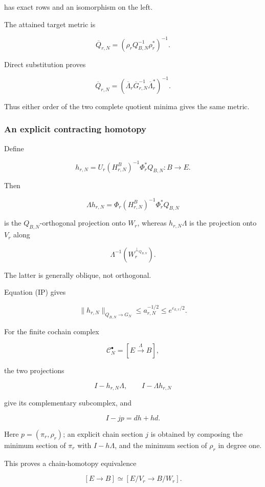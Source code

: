 \documentclass[11pt]{article}
\begin{document}
has exact rows and an isomorphism on the left.

The attained target metric is

\[
\overline Q_{r,N}
=
(\rho_rQ_{B,N}^{-1}\rho_r^*)^{-1}.
\]

Direct substitution proves

\[
\boxed{
\overline Q_{r,N}
=
\left(
\overline\Lambda_r\overline G_{r,N}^{-1}
\overline\Lambda_r^*
\right)^{-1}.
}
\tag{14}
\]

Thus either order of the two complete quotient minima gives the same metric.

\subsubsection{An explicit contracting homotopy}\label{an-explicit-contracting-homotopy}

Define

\[
\boxed{
h_{r,N}
=
U_r(H^B_{r,N})^{-1}\Phi_r^*Q_{B,N}:B\to E.
}
\tag{15}
\]

Then

\[
\Lambda h_{r,N}
=
\Phi_r(H^B_{r,N})^{-1}\Phi_r^*Q_{B,N}
\]

is the \(Q_{B,N}\)-orthogonal projection onto \(W_r\), whereas \(h_{r,N}\Lambda\) is the projection onto \(V_r\) along

\[
\Lambda^{-1}(W_r^{\perp_{Q_{B,N}}}).
\]

The latter is generally oblique, not orthogonal.

Equation (IP) gives

\[
\boxed{
\|h_{r,N}\|_{Q_{B,N}\to G_N}\le a_{r,N}^{-1/2}
\le e^{\varepsilon_{k,r}/2}.
}
\tag{16}
\]

For the finite cochain complex

\[
\mathcal C_N^\bullet=[E\xrightarrow{\Lambda}B],
\]

the two projections

\[
I-h_{r,N}\Lambda,\qquad I-\Lambda h_{r,N}
\]

give its complementary subcomplex, and

\[
I-jp=dh+hd.
\tag{17}
\]

Here \(p=(\pi_r,\rho_r)\); an explicit chain section \(j\) is obtained by composing the minimum section of \(\pi_r\) with \(I-h\Lambda\), and the minimum section of \(\rho_r\) in degree one.

This proves a chain-homotopy equivalence

\[
\boxed{
[E\to B]\simeq[E/V_r\to B/W_r].
}
\tag{18}
\]
\end{document}
